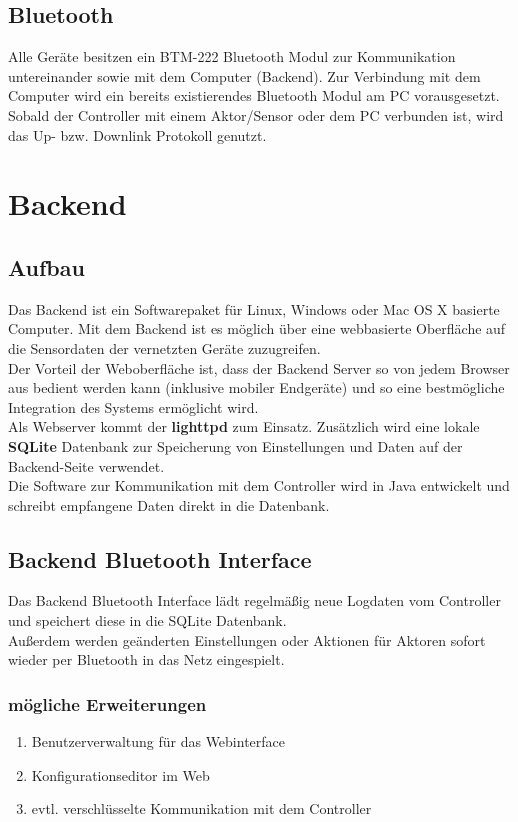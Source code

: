 \documentclass[12pt,a4paper]{article}
\begin{document}
\subsection{Bluetooth}
Alle Geräte besitzen ein BTM-222 Bluetooth Modul zur Kommunikation untereinander sowie mit dem Computer (Backend). Zur Verbindung mit dem Computer wird ein bereits existierendes Bluetooth Modul am PC vorausgesetzt. \\
Sobald der Controller mit einem Aktor/Sensor oder dem PC verbunden ist, wird das Up- bzw. Downlink Protokoll genutzt.

\section{Backend}

\subsection{Aufbau}

Das Backend ist ein Softwarepaket für Linux, Windows oder Mac OS X basierte Computer. Mit dem Backend ist es möglich über eine webbasierte Oberfläche auf die Sensordaten der vernetzten Geräte zuzugreifen. \\
Der Vorteil der Weboberfläche ist, dass der Backend Server so von jedem Browser aus bedient werden kann (inklusive mobiler Endgeräte) und so eine bestmögliche Integration des Systems ermöglicht wird. \\
Als Webserver kommt der {\bf lighttpd} zum Einsatz. Zusätzlich wird eine lokale {\bf SQLite} Datenbank zur Speicherung von Einstellungen und Daten auf der Backend-Seite verwendet.\\
Die Software zur Kommunikation mit dem Controller wird in Java entwickelt und schreibt empfangene Daten direkt in die Datenbank.

\subsection{Backend Bluetooth Interface}
\label{subsec:BTBackend}

Das Backend Bluetooth Interface lädt regelmäßig neue Logdaten vom Controller und speichert diese in die SQLite Datenbank.\\
Außerdem werden geänderten Einstellungen oder Aktionen für Aktoren sofort wieder per Bluetooth in das Netz eingespielt.

\subsubsection{mögliche Erweiterungen}

\begin{enumerate}
	\item Benutzerverwaltung für das Webinterface
	\item Konfigurationseditor im Web
	\item evtl. verschlüsselte Kommunikation mit dem Controller
\end{enumerate}
\end{document}
